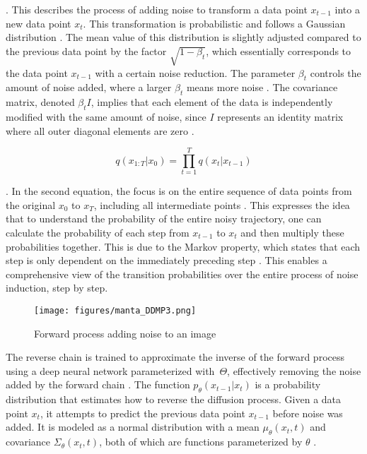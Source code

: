 \citep{martinez2023understanding}. This describes the process of adding noise to transform a data point \( x_{t-1} \) into a new data point \( x_t \). This transformation is probabilistic and follows a Gaussian distribution \citep{sohlDDPM, hoDDPMs}. The mean value of this distribution is slightly adjusted compared to the previous data point by the factor \( \sqrt{1 - \beta_t} \), which essentially corresponds to the data point \( x_{t-1} \) with a certain noise reduction. The parameter \( \beta_t \) controls the amount of noise added, where a larger \( \beta_t \) means more noise \citep{kingma2023variationalDM}. The covariance matrix, denoted \( \beta_t I \), implies that each element of the data is independently modified with the same amount of noise, since \(I\) represents an identity matrix where all outer diagonal elements are zero \citep{croitoru2023diffusion}.

\[q(x_{1:T} | x_0) = \prod_{t=1}^T q(x_t | x_{t-1}) \] 

\citep{martinez2023understanding}. In the second equation, the focus is on the entire sequence of data points from the original \( x_0 \) to \( x_T \), including all intermediate points \citep{martinez2023understanding}. This expresses the idea that to understand the probability of the entire noisy trajectory, one can calculate the probability of each step from \( x_{t-1} \) to \( x_t \) and then multiply these probabilities together. This is due to the Markov property, which states that each step is only dependent on the immediately preceding step \citep{martinez2023understanding}. This enables a comprehensive view of the transition probabilities over the entire process of noise induction, step by step.

\begin{figure}[ht]
\centering
  \texttt{[image: figures/manta\_DDMP3.png]}
  \caption{Forward process adding noise to an image}
  \label{fig:figureForwardProcess}
\end{figure}

The reverse chain is trained to approximate the inverse of the forward process using a deep neural network parameterized with~\(\Theta\), effectively removing the noise added by the forward chain \citep{sohlDDPM, yangdiffusionSummary}. The function \( p_\theta(x_{t-1} | x_t) \) is a probability distribution that estimates how to reverse the diffusion process. Given a data point \( x_t \), it attempts to predict the previous data point \( x_{t-1} \) before noise was added. It is modeled as a normal distribution with a mean \( \mu_\theta(x_t, t) \) and covariance \( \Sigma_\theta(x_t, t) \), both of which are functions parameterized by \( \theta \) \citep{yangdiffusionSummary}.

